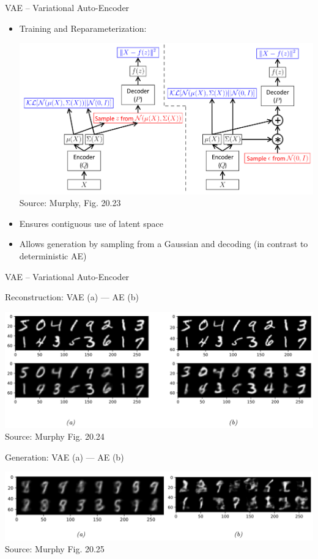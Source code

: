 \documentclass[ignorenonframetext,xcolor=x11names]{beamer}
\begin{document}
   
\begin{frame}{VAE -- Variational Auto-Encoder}

\begin{itemize}

\item Training and Reparameterization:

\begin{center}
\includegraphics[width=.8\textwidth]{murphy_20_23.png}\\

\scriptsize Source: Murphy, Fig. 20.23 \normalsize
\end{center}

\item Ensures contiguous use of latent space
\item Allows generation by sampling from a Gaussian and decoding (in contrast to deterministic AE)
\end{itemize}

\end{frame}

\begin{frame}{VAE -- Variational Auto-Encoder}

Reconstruction: VAE (a) --- AE (b) \\
\begin{center}
\includegraphics[width=.8\textwidth]{murphy_20_24.png} \\
\scriptsize Source: Murphy Fig. 20.24 \normalsize
\end{center}

Generation: VAE (a) --- AE (b) \\
\begin{center}
\includegraphics[width=.8\textwidth]{murphy_20_25.png} \\
\scriptsize Source: Murphy Fig. 20.25 \normalsize
\end{center}
\end{frame}
\end{document}
